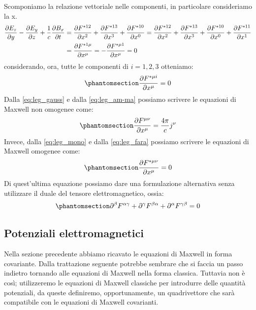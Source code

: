 Scomponiamo la relazione vettoriale nelle componenti, in particolare consideriamo la x.
\begin{equation*}
\begin{aligned}
   \dfrac{\partial E_z}{\partial y}-\dfrac{\partial E_y}{\partial z}+\dfrac{1}{c}\dfrac{\partial B_x}{\partial t}&=\dfrac{\partial F\indices{^{*12}}}{\partial x^2}+\dfrac{\partial F\indices{^{*13}}}{\partial x^3}+\dfrac{\partial F\indices{^{*10}}}{\partial x^0}=\dfrac{\partial F\indices{^{*12}}}{\partial x^2}+\dfrac{\partial F\indices{^{*13}}}{\partial x^3}+\dfrac{\partial F\indices{^{*10}}}{\partial x^0}+\dfrac{\partial F\indices{^{*11}}}{\partial x^1}\\
   &=\dfrac{\partial F\indices{^{*1\mu}}}{\partial x^\mu}=-\dfrac{\partial F\indices{^{*\mu1}}}{\partial x^\mu}=0
   \end{aligned}
\end{equation*}
considerando, ora, tutte le componenti di $i=1,2,3$ otteniamo:
\begin{equation}\phantomsection\label{eq:leg_fara}
    \dfrac{\partial F\indices{^{*\mu i}}}{\partial x^\mu}=0
\end{equation} 
Dalla \eqref{eq:leg_gauss} e dalla \eqref{eq:leg_am-ma} possiamo scrivere le equazioni di Maxwell non omogenee come:
\begin{equation}\phantomsection\label{eq:eq_non_omo}
    \dfrac{\partial F\indices{^{\mu \nu}}}{\partial x^\mu}=\dfrac{4\pi}{c}j^\nu
\end{equation}
Invece, dalla \eqref{eq:leg_mono} e dalla \eqref{eq:leg_fara} possiamo scrivere le equazioni di Maxwell omogenee come:
\begin{equation}\phantomsection\label{eq:eq_omo}
    \dfrac{\partial F\indices{^{*\mu \nu}}}{\partial x^\mu}=0
\end{equation} 
Di quest'ultima equazione possiamo dare una formulazione alternativa senza utilizzare il duale del tensore elettromagnetico, ossia: 
\begin{equation}\phantomsection\label{eq:omo_no_duale}
\partial^\beta F^{\alpha\gamma}+\partial^\gamma F^{\beta\alpha} +\partial^\alpha F^{\gamma\beta}=0
\end{equation}  
\subsection{Potenziali elettromagnetici}\label{sec:2.4}
Nella sezione precedente abbiamo ricavato le equazioni di Maxwell in forma covariante. Dalla trattazione seguente potrebbe sembrare che si faccia un passo indietro tornando alle equazioni di Maxwell nella forma classica. Tuttavia non è così; utilizzeremo le equazioni di Maxwell classiche per introdurre delle quantità potenziali, da queste definiremo, opportunamente, un quadrivettore che sarà compatibile con le equazioni di Maxwell covarianti.

